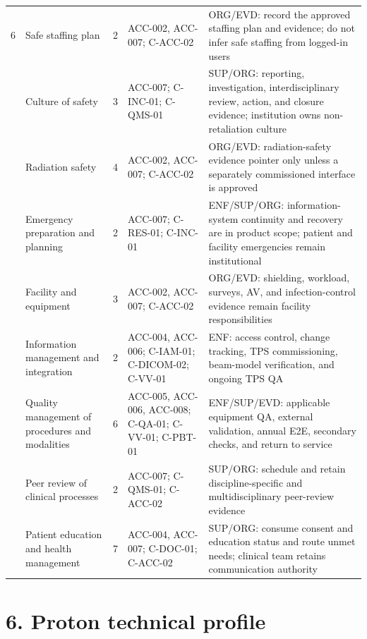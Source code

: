 \documentclass[11pt,letterpaper]{article}
\begin{document}
\begin{scriptsize}
\begin{longtable}{@{}L{0.07\textwidth}L{0.25\textwidth}L{0.08\textwidth}L{0.24\textwidth}L{0.28\textwidth}@{}}
6 & Safe staffing plan & 2 & ACC-002, ACC-007; C-ACC-02 & ORG/EVD: record the approved staffing plan and evidence; do not infer safe staffing from logged-in users \\
 & Culture of safety & 3 & ACC-007; C-INC-01; C-QMS-01 & SUP/ORG: reporting, investigation, interdisciplinary review, action, and closure evidence; institution owns non-retaliation culture \\
 & Radiation safety & 4 & ACC-002, ACC-007; C-ACC-02 & ORG/EVD: radiation-safety evidence pointer only unless a separately commissioned interface is approved \\
 & Emergency preparation and planning & 2 & ACC-007; C-RES-01; C-INC-01 & ENF/SUP/ORG: information-system continuity and recovery are in product scope; patient and facility emergencies remain institutional \\
 & Facility and equipment & 3 & ACC-002, ACC-007; C-ACC-02 & ORG/EVD: shielding, workload, surveys, AV, and infection-control evidence remain facility responsibilities \\
 & Information management and integration & 2 & ACC-004, ACC-006; C-IAM-01; C-DICOM-02; C-VV-01 & ENF: access control, change tracking, TPS commissioning, beam-model verification, and ongoing TPS QA \\
 & Quality management of procedures and modalities & 6 & ACC-005, ACC-006, ACC-008; C-QA-01; C-VV-01; C-PBT-01 & ENF/SUP/EVD: applicable equipment QA, external validation, annual E2E, secondary checks, and return to service \\
 & Peer review of clinical processes & 2 & ACC-007; C-QMS-01; C-ACC-02 & SUP/ORG: schedule and retain discipline-specific and multidisciplinary peer-review evidence \\
 & Patient education and health management & 7 & ACC-004, ACC-007; C-DOC-01; C-ACC-02 & SUP/ORG: consume consent and education status and route unmet needs; clinical team retains communication authority \\
\end{longtable}
\end{scriptsize}

\section{6. Proton technical profile}
\end{document}

